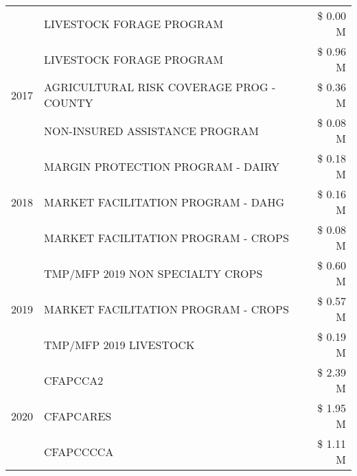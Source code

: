 \begin{tabular}{llr}
 & LIVESTOCK FORAGE PROGRAM & \$ 0.00 M \\
\cline{1-3}
\multirow[t]{3}{*}{2017} & LIVESTOCK FORAGE PROGRAM & \$ 0.96 M \\
 & AGRICULTURAL RISK COVERAGE PROG - COUNTY & \$ 0.36 M \\
 & NON-INSURED ASSISTANCE PROGRAM & \$ 0.08 M \\
\cline{1-3}
\multirow[t]{3}{*}{2018} & MARGIN PROTECTION PROGRAM - DAIRY & \$ 0.18 M \\
 & MARKET FACILITATION PROGRAM - DAHG & \$ 0.16 M \\
 & MARKET FACILITATION PROGRAM - CROPS & \$ 0.08 M \\
\cline{1-3}
\multirow[t]{3}{*}{2019} & TMP/MFP 2019 NON SPECIALTY CROPS & \$ 0.60 M \\
 & MARKET FACILITATION PROGRAM - CROPS & \$ 0.57 M \\
 & TMP/MFP 2019 LIVESTOCK & \$ 0.19 M \\
\cline{1-3}
\multirow[t]{3}{*}{2020} & CFAPCCA2 & \$ 2.39 M \\
 & CFAPCARES & \$ 1.95 M \\
 & CFAPCCCCA & \$ 1.11 M \\
\cline{1-3}
\bottomrule
\end{tabular}
